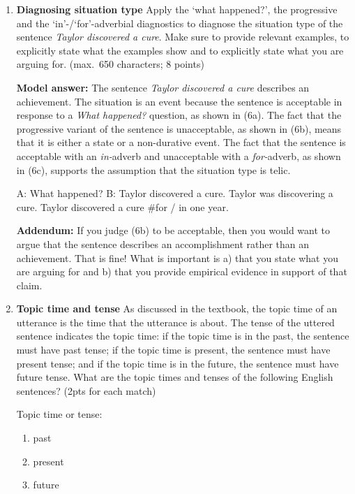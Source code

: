 \documentclass[a4,11pt]{article}
\def\infelic{{\leavevmode\llap{\#}}}
\newcommand{\6}{\mbox{$[\hspace*{-.6mm}[$}}
\newcommand{\9}{\mbox{$]\hspace*{-.6mm}]$}}
\begin{document}
\begin{enumerate}[leftmargin = 12pt]
\item {\bf Diagnosing situation type} Apply the `what happened?', the progressive and the `in'-/`for'-adverbial diagnostics to diagnose the situation type of the sentence {\em Taylor discovered a cure}.  Make sure to provide relevant examples, to explicitly state what the examples show and to explicitly state what you are arguing for. (max.\ 650 characters; 8 points)

{\bf Model answer:} The sentence {\em Taylor discovered a cure} describes an achievement. The situation is an event because the sentence is acceptable in response to a {\em What happened?} question, as shown in (6a). The fact that the progressive variant of the sentence is unacceptable, as shown in (6b), means that it is either a state or a non-durative event. The fact that the sentence is acceptable with an {\em in-}adverb and unacceptable with a {\em for-}adverb, as shown in (6c), supports the assumption that the situation type is telic.

\begin{exe}
\ex
\begin{xlist}
\ex A: What happened?  B: Taylor discovered a cure.
\ex \infelic Taylor was discovering a cure.
\ex Taylor discovered a cure \#for / in one year.
\end{xlist}
\end{exe}

{\bf Addendum:} If you judge (6b) to be acceptable, then you would want to argue that the sentence describes an accomplishment rather than an achievement. That is fine! What is important is a) that you state what you are arguing for and b) that you provide empirical evidence in support of that claim.

\item {\bf Topic time and tense} As discussed in the textbook, the topic time of an utterance is the time that the utterance is about. The tense of the uttered sentence indicates the topic time: if the topic time is in the past, the sentence must have past tense; if the topic time is present, the sentence must have present tense; and if the topic time is in the future, the sentence must have future tense.  What are the topic times and tenses of the following English sentences? (2pts for each match)

Topic time or tense:

\begin{enumerate}[noitemsep]
\item past
\item present
\item future
\end{enumerate}


\end{enumerate}
\end{document}
